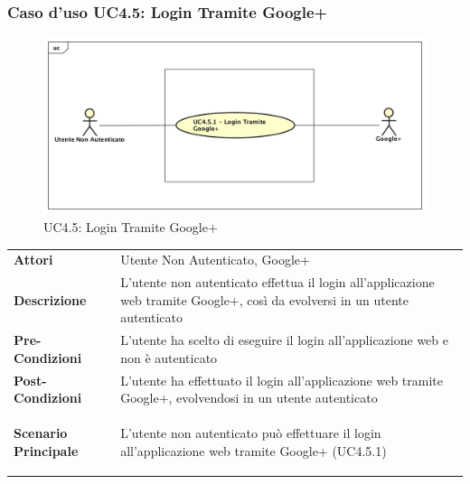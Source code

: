 
\subsubsection{Caso d'uso UC4.5: Login Tramite Google+ }
\label{UC4_5}
\begin{figure}[ht]
	\centering
	\includegraphics[scale=0.45]{UML/UC4_5.png}
	\caption{UC4.5: Login Tramite Google+ }
\end{figure}

\begin{longtable}{ l | p{11cm}}
	\hline
	\rowcolor{Gray}
	 \multicolumn{2}{c}{UC4.5 - Login Tramite Google+} \\
	 \hline
	\textbf{Attori} & Utente Non Autenticato, Google+ \\
	\textbf{Descrizione} & L'utente non autenticato effettua il login all'applicazione web tramite Google+, così da evolversi in un utente autenticato\\
	\textbf{Pre-Condizioni} & L'utente ha scelto di eseguire il login all'applicazione web e non è autenticato \\
	\textbf{Post-Condizioni} & L'utente ha effettuato il login all'applicazione web tramite Google+, evolvendosi in un utente autenticato\\
	\textbf{Scenario Principale} & \begin{enumerate*}[label=(\arabic*.),itemjoin={\newline}]
		\item L'utente non autenticato può effettuare il login all'applicazione web tramite Google+ (UC4.5.1)
	\end{enumerate*}\\
\end{longtable}